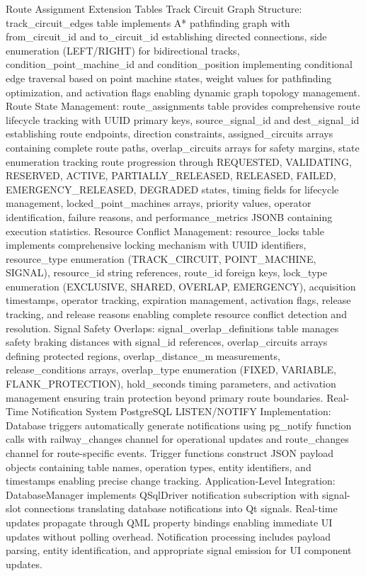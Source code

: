 Route Assignment Extension Tables
Track Circuit Graph Structure: track_circuit_edges table implements A* pathfinding graph with from_circuit_id and to_circuit_id establishing directed connections, side enumeration (LEFT/RIGHT) for bidirectional tracks, condition_point_machine_id and condition_position implementing conditional edge traversal based on point machine states, weight values for pathfinding optimization, and activation flags enabling dynamic graph topology management.
Route State Management: route_assignments table provides comprehensive route lifecycle tracking with UUID primary keys, source_signal_id and dest_signal_id establishing route endpoints, direction constraints, assigned_circuits arrays containing complete route paths, overlap_circuits arrays for safety margins, state enumeration tracking route progression through REQUESTED, VALIDATING, RESERVED, ACTIVE, PARTIALLY_RELEASED, RELEASED, FAILED, EMERGENCY_RELEASED, DEGRADED states, timing fields for lifecycle management, locked_point_machines arrays, priority values, operator identification, failure reasons, and performance_metrics JSONB containing execution statistics.
Resource Conflict Management: resource_locks table implements comprehensive locking mechanism with UUID identifiers, resource_type enumeration (TRACK_CIRCUIT, POINT_MACHINE, SIGNAL), resource_id string references, route_id foreign keys, lock_type enumeration (EXCLUSIVE, SHARED, OVERLAP, EMERGENCY), acquisition timestamps, operator tracking, expiration management, activation flags, release tracking, and release reasons enabling complete resource conflict detection and resolution.
Signal Safety Overlaps: signal_overlap_definitions table manages safety braking distances with signal_id references, overlap_circuits arrays defining protected regions, overlap_distance_m measurements, release_conditions arrays, overlap_type enumeration (FIXED, VARIABLE, FLANK_PROTECTION), hold_seconds timing parameters, and activation management ensuring train protection beyond primary route boundaries.
Real-Time Notification System
PostgreSQL LISTEN/NOTIFY Implementation: Database triggers automatically generate notifications using pg_notify function calls with railway_changes channel for operational updates and route_changes channel for route-specific events. Trigger functions construct JSON payload objects containing table names, operation types, entity identifiers, and timestamps enabling precise change tracking.
Application-Level Integration: DatabaseManager implements QSqlDriver notification subscription with signal-slot connections translating database notifications into Qt signals. Real-time updates propagate through QML property bindings enabling immediate UI updates without polling overhead. Notification processing includes payload parsing, entity identification, and appropriate signal emission for UI component updates.
